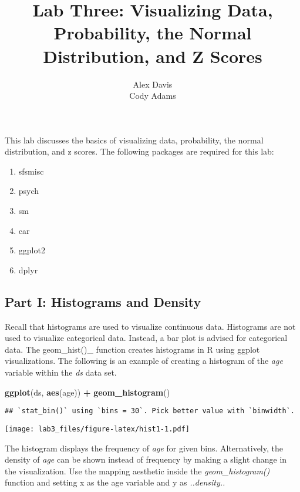 \documentclass[]{article}
\title{Lab Three: Visualizing Data, Probability, the Normal Distribution, and Z
Scores}
\author{Alex Davis \\ Cody Adams}
\date{}
\newenvironment{Shaded}{\begin{snugshade}}{\end{snugshade}}
\newcommand{\KeywordTok}[1]{\textcolor[rgb]{0.13,0.29,0.53}{\textbf{#1}}}
\newcommand{\StringTok}[1]{\textcolor[rgb]{0.31,0.60,0.02}{#1}}
\newcommand{\OperatorTok}[1]{\textcolor[rgb]{0.81,0.36,0.00}{\textbf{#1}}}
\newcommand{\NormalTok}[1]{#1}
\providecommand{\tightlist}{%
  \setlength{\itemsep}{0pt}\setlength{\parskip}{0pt}}
\begin{document}
\maketitle

This lab discusses the basics of visualizing data, probability, the
normal distribution, and z scores. The following packages are required
for this lab:

\begin{enumerate}
\def\labelenumi{\arabic{enumi}.}
\tightlist
\item
  sfsmisc
\item
  psych
\item
  sm
\item
  car
\item
  ggplot2
\item
  dplyr
\end{enumerate}

\subsection{Part I: Histograms and
Density}\label{part-i-histograms-and-density}

Recall that histograms are used to visualize continuous data. Histograms
are not used to visualize categorical data. Instead, a bar plot is
advised for categorical data. The geom\_hist()\_ function creates
histograms in R using ggplot visualizations. The following is an example
of creating a histogram of the \emph{age} variable within the \emph{ds}
data set.

\begin{Shaded}
\begin{Highlighting}[]
\KeywordTok{ggplot}\NormalTok{(ds, }\KeywordTok{aes}\NormalTok{(age)) }\OperatorTok{+}
\StringTok{  }\KeywordTok{geom_histogram}\NormalTok{()}
\end{Highlighting}
\end{Shaded}

\begin{verbatim}
## `stat_bin()` using `bins = 30`. Pick better value with `binwidth`.
\end{verbatim}

\texttt{[image: lab3\_files/figure-latex/hist1-1.pdf]}

The histogram displays the frequency of \emph{age} for given bins.
Alternatively, the density of \emph{age} can be shown instead of
frequency by making a slight change in the visualization. Use the
mapping aesthetic inside the \emph{geom\_histogram()} function and
setting x as the age variable and y as \emph{..density..}
\end{document}
